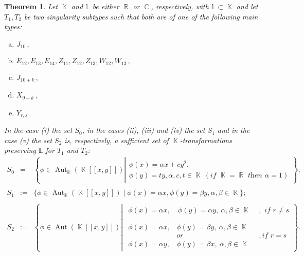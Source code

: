 \documentclass[noend]{amsproc}
\newtheorem{theorem}{Theorem}
\theoremstyle{definition}
\DeclareMathOperator{\R}{\mathbb{R}}
\DeclareMathOperator{\C}{\mathbb{C}}
\DeclareMathOperator{\K}{\mathbb{K}}
\DeclareMathOperator{\Aut}{Aut}
\begin{document}
\begin{theorem}\label{tab:sufficient_sets}\label{thm:sufficient_sets}
Let $\K$ and $\mathbb L$ be either $\R$ or $\C$, respectively, with
$\mathbb L\subset \K$ and let $T_1,T_2$ be two singularity subtypes such that
both are of one of the following main types:
\begin{enumerate}[(a)]
\item[(i)] $J_{10}\,,$
\item[(ii)] $E_{12},E_{13},E_{14},Z_{11},Z_{12},Z_{13},W_{12},W_{13}\,,$
\item[(iii)] $ J_{10+k}\,,$
\item[(iv)] $X_{9+k}\,,$
\item[(v)] $Y_{r,s}\,.$
\end{enumerate}
In the case (i) the set $S_0$, in the cases (ii), (iii) and (iv) the set $S_1$
and in the case (v) the set $S_2$ is, respectively, a sufficient set of
$\K$-transformations preserving $\mathbb L$ for $T_1$ and $T_2$:
\begin{eqnarray*}
S_0&=&\left\{\phi\in\Aut_{\K}(\K[[x,y]])\left |
\begin{array}{l}
\phi(x)=\alpha x+cy^2,\\
\phi(y)=ty, \alpha,c,t\in\K\ (\textit{if $\K=\R$ then $\alpha=1$})
\end{array}
\right.\right\};\\\\
S_1&:=&\{\phi\in\Aut_{\K}(\K[[x,y]])
\mid \phi(x)=\alpha x, \phi(y)=\beta y, \alpha, \beta\in\K\};\\\\
S_2&:=&\left\{\phi\in\Aut({\K}[[x,y]]) \left |
\begin{array}{ll}
\begin{array}{l}
\phi(x)=\alpha x,\quad \phi(y)=\alpha y,\ \alpha,\beta\in\K
\end{array}
&, \textit{ if $r\neq s$}\\\\
\begin{array}{ll}
\phi(x)=\alpha x,& \phi(y)=\beta y,\ \alpha,\beta\in\K\\&\textit{or}\\
\phi(x)=\alpha y,& \phi(y)=\beta x,\ \alpha,\beta\in\K
\end{array}
&,\textit{if $r=s$}
\end{array}
\right.\right\}.
\end{eqnarray*}
\end{theorem}
\end{document}
